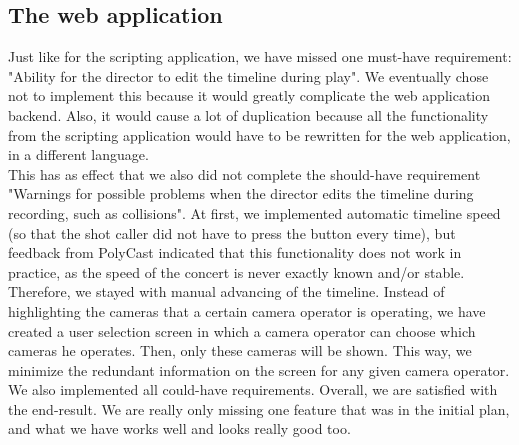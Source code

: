 \subsection{The web application}
Just like for the scripting application, we have missed one must-have requirement: "Ability for the director to edit the timeline during play". We eventually chose not to implement this because it would greatly complicate the web application backend. Also, it would cause a lot of duplication because all the functionality from the scripting application would have to be rewritten for the web application, in a different language.\\
This has as effect that we also did not complete the should-have requirement "Warnings for possible problems when the director edits the timeline during recording, such as collisions". At first, we implemented automatic timeline speed (so that the shot caller did not have to press the button every time), but feedback from PolyCast indicated that this functionality does not work in practice, as the speed of the concert is never exactly known and/or stable. Therefore, we stayed with manual advancing of the timeline. Instead of highlighting the cameras that a certain camera operator is operating, we have created a user selection screen in which a camera operator can choose which cameras he operates. Then, only these cameras will be shown. This way, we minimize the redundant information on the screen for any given camera operator.\\
We also implemented all could-have requirements. Overall, we are satisfied with the end-result. We are really only missing one feature that was in the initial plan, and what we have works well and looks really good too.

